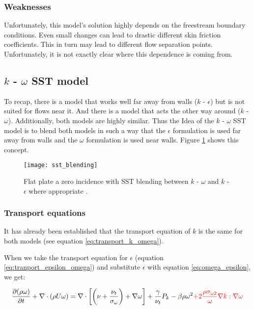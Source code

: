 \subsubsection{Weaknesses}
Unfortunately, this model's solution highly depends on the freestream boundary
conditions. Even small changes can lead to drastic different skin friction
coefficients. This in turn may lead to different flow separation points.
Unfortunately, it is not exactly clear where this dependence is coming from.
\cite{cfd101_k-omega}




\subsection{$k$ - $\omega$ SST model}
To recap, there is a model that works well far away from walls ($k$ -
$\epsilon$) but is not suited for flows near it. And there is a model that acts
the other way around ($k$ - $\omega$). Additionally, both models are highly
similar. Thus the Idea of the $k$ - $\omega$ SST model is to blend both models
in such a way that the $\epsilon$ formulation is used far away from walls and
the $\omega$ formulation is used near walls. Figure \ref{fig:sst_blending}
shows this concept.

\begin{figure}[H] \centering
    \texttt{[image: sst\_blending]}
    \caption{Flat plate a zero incidence with SST blending between $k$ -
    $\omega$ and $k$ - $\epsilon$ where appropriate \cite{cfd101_k-omega}.}
    \label{fig:sst_blending}
\end{figure}


\subsubsection{Transport equations}
It has already been established that the transport equation of $k$ is the same
for both models (see equation \ref{eq:transport_k_omega}). 

When we take the transport equation for $\epsilon$ (equation
\ref{eq:tranport_epsilon_omega}) and substitute $\epsilon$ with equation
\ref{eq:omega_epsilon}, we get:

\begin{equation}
    \frac{\partial (\rho \omega)}{\partial t} + 
    \nabla \cdot (\rho U \omega) =
    \nabla \cdot \left[ 
        \left( \nu + \frac{\nu_t}{\sigma_{\omega}}\right) + \nabla  \omega
    \right] + \frac{\gamma}{\nu_t} P_k - \beta \rho \omega^2 
    \textcolor{red}{
        + 2 \frac{\rho \sigma_{\omega 2}}{\omega} \nabla k : \nabla \omega
    }
\end{equation}

